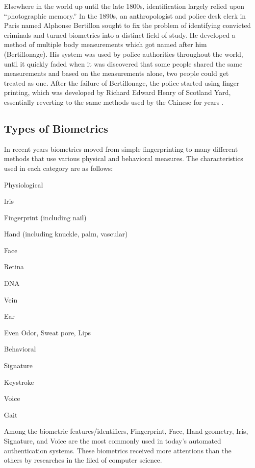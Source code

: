 Elsewhere in the world up until the late 1800s, identification
largely relied upon ``photographic memory.'' In the 1890s, an
anthropologist and police desk clerk in Paris named Alphonse
Bertillon sought to fix the problem of identifying convicted
criminals and turned biometrics into a distinct field of study. He
developed a method of multiple body measurements which got named
after him (Bertillonage). His system was used by police authorities
throughout the world, until it quickly faded when it was discovered
that some people shared the same measurements and based on the
measurements alone, two people could get treated as one. After the
failure of Bertillonage, the police started using finger printing,
which was developed by Richard Edward Henry of Scotland Yard,
essentially reverting to the same methods used by the Chinese for
years \cite{Garfinkel2000}.

\subsection{Types of Biometrics} In recent years biometrics moved from simple fingerprinting to many different methods that use
various physical and behavioral measures. The characteristics used
in each category are as follows:

\bi \item Physiological
    \bi
        \item Iris
        \item Fingerprint (including nail)
        \item Hand (including knuckle, palm, vascular)
        \item Face
        \item Retina
        \item DNA
        \item Vein
        \item Ear
        \item Even Odor, Sweat pore, Lips
    \ei
\item Behavioral
    \bi
        \item Signature
        \item Keystroke
        \item Voice
        \item Gait
    \ei
\ei

Among the biometric features/identifiers, Fingerprint, Face, Hand
geometry, Iris, Signature, and Voice are the most commonly used in
today's automated authentication systems. These biometrics received
more attentions than the others by researches in the filed of
computer science.

